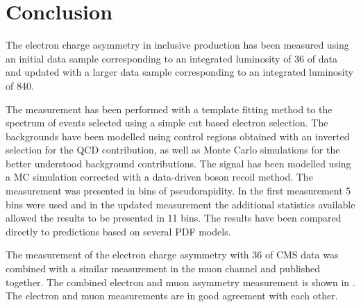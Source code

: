 \chapter{Conclusion}
\label{chap:conclusion}

The electron charge asymmetry in inclusive \PW production has been measured
using an initial data sample corresponding to an integrated luminosity of
\unit{36}{\invpb} of data and updated with a larger data sample corresponding to
an integrated luminosity of \unit{840}{\invpb}.

The measurement has been performed with a template fitting method to the \ETm
spectrum of events selected using a simple cut based electron selection.
The backgrounds have been modelled using control regions obtained with an
inverted selection for the QCD contribution, as well as Monte Carlo simulations
for the better understood background contributions.
The signal has been modelled using a MC simulation corrected with a data-driven
boson recoil method.
The measurement was presented in bins of pseudorapidity. In the first
measurement 5 bins were used and in the updated measurement the additional
statistics available allowed the results to be presented in 11 bins.
The results have been compared directly to predictions based on several PDF
models. 


The measurement of the electron charge asymmetry with
\unit{36}{\invpb} of CMS data\cite{baisini2010electron} was combined with a
similar measurement in the muon channel\cite{majumder2010muon} and published
together\cite{asym36}.  The combined electron and muon asymmetry measurement is
shown in . The electron and muon measurements are in
good agreement with each other.

